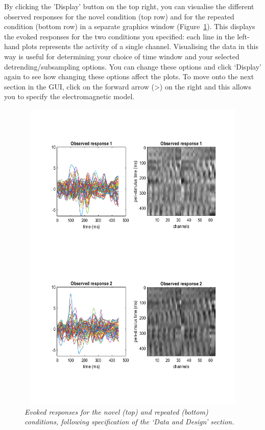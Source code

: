By clicking the 'Display' button on the top right, you can visualise the
different observed responses for the novel condition (top row) and for
the repeated condition (bottom row) in a separate graphics window
(Figure~\ref{dcm-erp:fig:2}). This displays the evoked responses for the two
conditions you specified: each line in the left-hand plots represents
the activity of a single channel. Visualising the data in this way is
useful for determining your choice of time window and your selected
detrending/subsampling options. You can change these options and click
`Display' again to see how changing these options affect the plots. To
move onto the next section in the GUI, click on the forward arrow
(\textgreater{}) on the right and this allows you to specify the
electromagnetic model.

\begin{figure}
\begin{center}
\includegraphics[width=4.54639in,height=6.02062in]{dcm_erp/figures/evoked_responses.png}
\caption{\em Evoked responses for the novel (top) and repeated (bottom)
conditions, following specification of the `\emph{Data and Design}'
section.\label{dcm-erp:fig:2}}
\end{center}
\end{figure}

